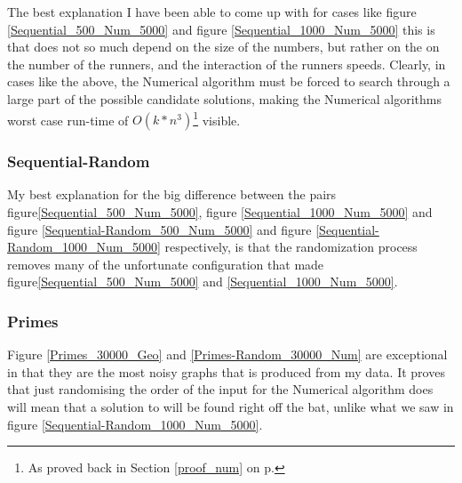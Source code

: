 
The best explanation I have been able to come up with for cases like figure \ref{Sequential_500_Num_5000} and figure \ref{Sequential_1000_Num_5000} this is that  does not so much depend on the size of the numbers, but rather on the on the number of the runners, and the interaction of the runners speeds. Clearly, in cases like the above, the Numerical algorithm must be forced to search through a large part of the possible candidate solutions, making the Numerical algorithms worst case run-time of $O(k * n^3)$\footnote{As proved back in Section \ref{proof_num} on p. \pageref{proof_num}} visible.

\subsubsection{Sequential-Random}

My best explanation for the big difference between the pairs figure\ref{Sequential_500_Num_5000}, figure \ref{Sequential_1000_Num_5000} and figure \ref{Sequential-Random_500_Num_5000} and figure \ref{Sequential-Random_1000_Num_5000} respectively, is that the randomization process removes many of the unfortunate configuration that made figure\ref{Sequential_500_Num_5000} and \ref{Sequential_1000_Num_5000}.

\subsubsection{Primes}

Figure \ref{Primes_30000_Geo} and \ref{Primes-Random_30000_Num} are exceptional in that they are the most noisy graphs that is produced from my data. It proves that just randomising the order of the input for the Numerical algorithm does will mean that a solution to  will be found right off the bat, unlike what we saw in figure \ref{Sequential-Random_1000_Num_5000}.  




